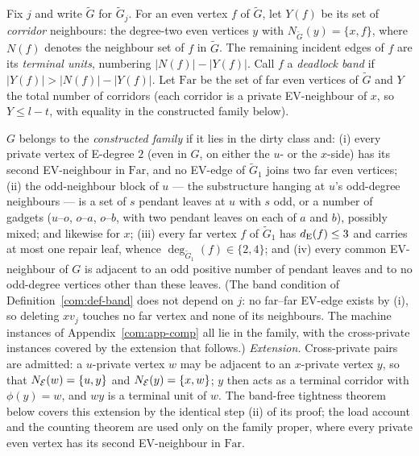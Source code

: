 \begin{definition}\label{com:def-band}
Fix $j$ and write $\tilde G$ for $\tilde G_j$. For an even vertex $f$ of
$\tilde G$, let $Y(f)$ be its set of \emph{corridor} neighbours: the
degree-two even vertices $y$ with $N_{\tilde G}(y)=\{x,f\}$, where $N(f)$
denotes the neighbour set of $f$ in $\tilde G$. The remaining incident
edges of $f$ are its \emph{terminal units}, numbering $|N(f)|-|Y(f)|$.
Call $f$ a \emph{deadlock band} if $|Y(f)|>|N(f)|-|Y(f)|$. Let
$\mathrm{Far}$ be the set of far even vertices of $\tilde G$ and $Y$ the
total number of corridors (each corridor is a private EV-neighbour of
$x$, so $Y\le l-t$, with equality in the constructed family below).
\end{definition}

\begin{definition}\label{com:def-family}
$G$ belongs to the \emph{constructed family} if it lies in the dirty
class and: (i) every private vertex of E-degree $2$ (even in $G$, on
either the $u$- or the $x$-side) has its second EV-neighbour in
$\mathrm{Far}$, and no EV-edge of $\tilde G_1$ joins two far even
vertices; (ii) the odd-neighbour block of $u$ --- the substructure hanging
at $u$'s odd-degree neighbours --- is a set of $s$ pendant leaves at $u$
with $s$ odd, or a number of gadgets ($u$--$o$, $o$--$a$, $o$--$b$, with
two pendant leaves on each of $a$ and $b$), possibly mixed; and likewise
for $x$; (iii) every far vertex $f$ of $\tilde G_1$ has $d_{\mathrm{E}}(f)\le3$ and
carries at most one repair leaf, whence $\deg_{\tilde G_1}(f)\in\{2,4\}$;
and (iv) every common EV-neighbour of $G$ is adjacent to an odd positive
number of pendant leaves and to no odd-degree vertices other than these
leaves. (The band condition of Definition~\ref{com:def-band} does not
depend on $j$: no far--far EV-edge exists by (i), so deleting $xv_j$
touches no far vertex and none of its neighbours. The machine instances
of Appendix~\ref{com:app-comp} all lie in the family, with the
cross-private instances covered by the extension that follows.)
\emph{Extension.} Cross-private pairs are admitted: a $u$-private vertex
$w$ may be adjacent to an $x$-private vertex $y$, so that
$N_{\mathcal{E}}(w)=\{u,y\}$ and $N_{\mathcal{E}}(y)=\{x,w\}$; $y$ then acts as a
terminal corridor with $\phi(y)=w$, and $wy$ is a terminal unit of $w$.
The band-free tightness theorem below covers this extension by the
identical step (ii) of its proof; the load account and the counting
theorem are used only on the family proper, where every private even
vertex has its second EV-neighbour in $\mathrm{Far}$.
\end{definition}

